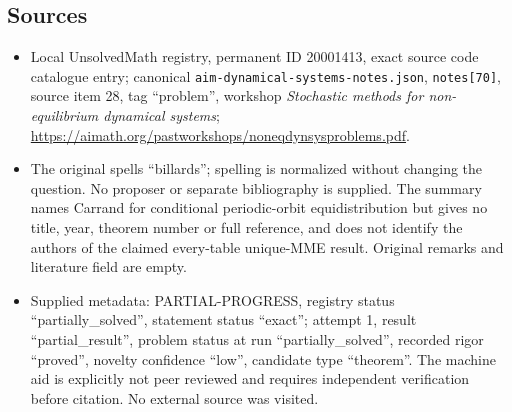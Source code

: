 \documentclass[11pt]{article}
\begin{document}
\subsection{Sources}
\begin{itemize}
\item Local UnsolvedMath registry, permanent ID 20001413, exact source code catalogue entry; canonical \texttt{aim-dynamical-systems-notes.json}, \texttt{notes[70]}, source item 28, tag ``problem'', workshop \emph{Stochastic methods for non-equilibrium dynamical systems}; \url{https://aimath.org/pastworkshops/noneqdynsysproblems.pdf}.
\item The original spells ``billards''; spelling is normalized without changing the question. No proposer or separate bibliography is supplied. The summary names Carrand for conditional periodic-orbit equidistribution but gives no title, year, theorem number or full reference, and does not identify the authors of the claimed every-table unique-MME result. Original remarks and literature field are empty.
\item Supplied metadata: PARTIAL-PROGRESS, registry status ``partially\_solved'', statement status ``exact''; attempt 1, result ``partial\_result'', problem status at run ``partially\_solved'', recorded rigor ``proved'', novelty confidence ``low'', candidate type ``theorem''. The machine aid is explicitly not peer reviewed and requires independent verification before citation. No external source was visited.
\end{itemize}
\end{document}
